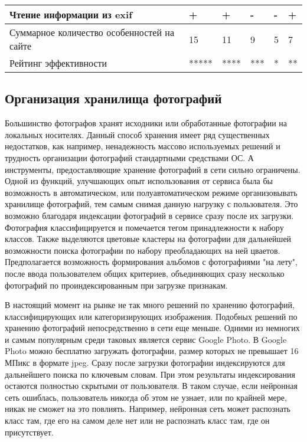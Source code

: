 \begin{table}[H]
\begin{spacing}{1}
\begin{tabular}{|p{3cm}|p{2.5cm}|p{2.5cm}|p{2.5cm}|p{2.5cm}|p{2cm}|}
  \hline Чтение информации из exif & + & + & - & - & + \\ 
  \hline Суммарное количество особенностей на сайте & 15 & 11 & 9 & 5 & 7 \\ 
  \hline Рейтинг эффективности & ***** & **** & *** & * & ** \\
  \hline
  \end{tabular}
  \end{spacing}
\end{table}

\subsection{Организация хранилища фотографий}

Большинство фотографов хранят исходники или обработанные фотографии на локальных носителях.
Данный способ хранения имеет ряд существенных недостатков, как например, ненадежность массово используемых решений и трудность организации фотографий стандартными средствами ОС.
А инструменты, предоставляющие хранение фотографий в сети сильно ограничены.
Одной из функций, улучшающих опыт использования от сервиса была бы возможность в автоматическом, или полуавтоматическом режиме организовывать хранилище фотографий, тем самым снимая данную нагрузку с пользователя.
Это возможно благодаря индексации фотографий в сервисе сразу после их загрузки. 
Фотография классифицируется и помечается тегом принадлежности к набору классов.
Также выделяются цветовые кластеры на фотографии для дальнейшей возможности поиска фотографии по набору преобладающих на ней цваетов.
Предполагается возможность формирования альбомов с фотографиями "на лету", после ввода пользователем общих критериев, объединяющих сразу несколько фотографий по проиндексированным при загрузке признакам.


В настоящий момент на рынке не так много решений по хранению фотографий, классифицирующих или категоризирующих изображения.
Подобных решений по хранению фотографий непосредственно в сети еще меньше.
Одними из немногих и самым популярным среди таковых является сервис Google Photo. 
В Google Photo можно бесплатно загружать фотографии, размер которых не превышает 16 МПикс в формате jpeg. 
Сразу после загрузки фотографии индексируются для дальнейшего поиска по ключевым словам.
При этом результаты индексирования остаются полностью скрытыми от пользователя. 
В таком случае, если нейронная сеть ошиблась, пользователь никогда об этом не узнает, или по крайней мере, никак не сможет на это повлиять. 
Например, нейронная сеть может распознать класс там, где его на самом деле нет или не распознать класс там, где он присутствует.

\clearpage